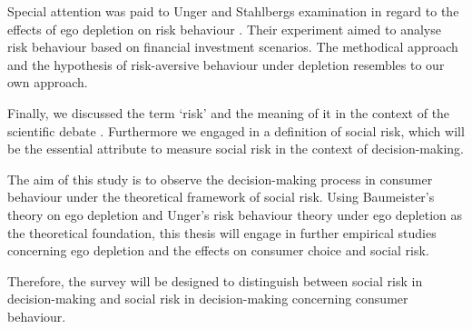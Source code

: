 Special attention was paid to Unger and Stahlbergs examination in regard to the effects of ego depletion on risk behaviour \citep{unger2011ego}. Their experiment aimed to analyse risk behaviour based on financial investment scenarios. The methodical approach and the hypothesis of risk-aversive behaviour under depletion resembles to our own approach.\par
Finally, we discussed the term ‘risk’ and the meaning of it in the context of the scientific debate \citep{ross1975perceived,dowling1994model}. Furthermore we engaged in a definition of social risk, which will be the essential attribute to measure social risk in the context of decision-making.\par
The aim of this study is to observe the decision-making process in consumer behaviour under the theoretical framework of social risk. Using Baumeister’s  theory on ego depletion and Unger’s risk behaviour theory under ego depletion as the theoretical foundation, this thesis will engage in further empirical studies concerning ego depletion and the effects on consumer choice and social risk.\par
Therefore, the survey will be designed to distinguish between social risk in decision-making and social risk in decision-making concerning consumer behaviour.

